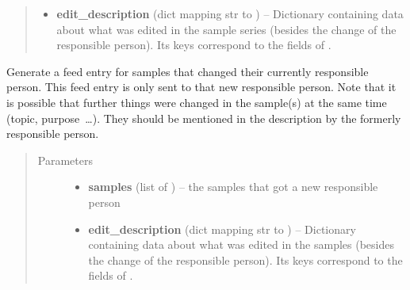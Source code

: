 \documentclass[a4paper,11pt,english]{sphinxmanual}
\begin{document}
\begin{fulllineitems}
\begin{fulllineitems}
\begin{quote}
\begin{description}
\begin{itemize}
\item {} 
\textbf{edit\_description} (dict mapping str to ) -- Dictionary containing data about what was
edited in the sample series (besides the change of the responsible
person).  Its keys correspond to the fields of
{\hyperref[programming/utilities:samples.utils.views.EditDescriptionForm]{}}.

\end{itemize}

\end{description}\end{quote}

\end{fulllineitems}


\begin{fulllineitems}
\label{programming/utilities:samples.utils.views.Reporter.report_new_responsible_person_samples}
Generate a feed entry for samples that changed their currently
responsible person.  This feed entry is only sent to that new
responsible person.  Note that it is possible that further things were
changed in the sample(s) at the same time (topic, purpose …).  They
should be mentioned in the description by the formerly responsible
person.
\begin{quote}\begin{description}
\item[{Parameters}] \leavevmode\begin{itemize}
\item {} 
\textbf{samples} (list of ) -- the samples that got a new responsible person

\item {} 
\textbf{edit\_description} (dict mapping str to ) -- Dictionary containing data about what was
edited in the samples (besides the change of the responsible
person).  Its keys correspond to the fields of
{\hyperref[programming/utilities:samples.utils.views.EditDescriptionForm]{}}.

\end{itemize}

\end{description}\end{quote}

\end{fulllineitems}


\end{fulllineitems}
\end{document}
